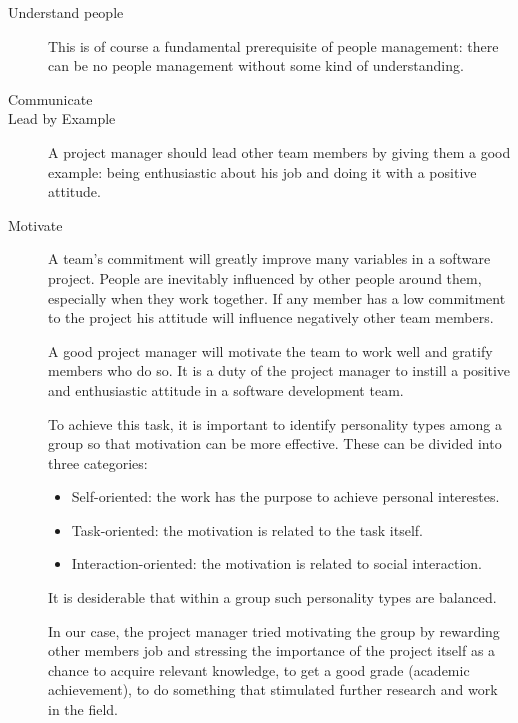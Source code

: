 \begin{description}

\item[Understand people]
This is of course a fundamental prerequisite of people management: there can be no people management without some kind of understanding.

\item[Communicate]


\item[Lead by Example]
A project manager should lead other team members by giving them a good example: being enthusiastic about his job
and doing it with a positive attitude.


\item[Motivate]
A team's commitment will greatly improve many variables in a software project.
People are inevitably influenced by other people around them, especially when they work together.
If any member has a low commitment to the project his attitude will influence negatively other team members.

A good project manager will motivate the team to work well and gratify members who do so.
It is a duty of the project manager to instill a positive and enthusiastic attitude in a software development team.

To achieve this task, it is important to identify personality types among a group so that
motivation can be more effective. These can be divided into three categories:
  \begin{itemize}
  \item Self-oriented: the work has the purpose to achieve personal interestes.
  \item Task-oriented: the motivation is related to the task itself.
  \item Interaction-oriented: the motivation is related to social interaction.
  \end{itemize}

It is desiderable that within a group such personality types are balanced.

In our case, the project manager tried motivating the group by rewarding other members job
and stressing the importance of the project itself as a chance to acquire relevant knowledge,
to get a good grade (academic achievement), to do something that stimulated further research and work
in the field.



\end{description}
